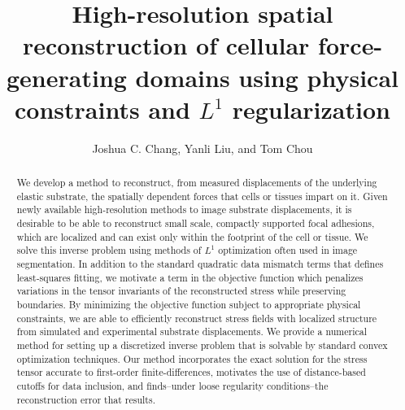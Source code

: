 \documentclass[aps,prl,reprint,twocolumn,groupedaddress,showpacs]{revtex4-1}
\begin{document}
\title{High-resolution spatial reconstruction of cellular
  force-generating domains using physical constraints and $L^{1}$
  regularization}

\author{Joshua C. Chang, Yanli Liu, and Tom Chou}
 






\begin{abstract}
We develop a method to reconstruct, from measured displacements of the
underlying elastic substrate, the spatially dependent forces that
cells or tissues impart on it.  Given newly available high-resolution
methods to image substrate displacements, it is desirable to be able
to reconstruct small scale, compactly supported focal adhesions, which
are localized and can exist only within the footprint of the cell or
tissue.  We solve this inverse problem using methods of $L^{1}$
optimization often used in image segmentation. In addition to the
standard quadratic data mismatch terms that defines least-squares
fitting, we motivate a term in the objective function which penalizes
variations in the tensor invariants of the reconstructed stress while
preserving boundaries.  By minimizing the objective function subject
to appropriate physical constraints, we are able to efficiently
reconstruct stress fields with localized structure from simulated and
experimental substrate displacements. We provide a numerical method
for setting up a discretized inverse problem that is solvable by
standard convex optimization techniques. Our method incorporates the
exact solution for the stress tensor accurate to first-order
finite-differences, motivates the use of distance-based cutoffs for
data inclusion, and finds--under loose regularity conditions--the
reconstruction error that results.
\end{abstract}
\maketitle
\end{document}

